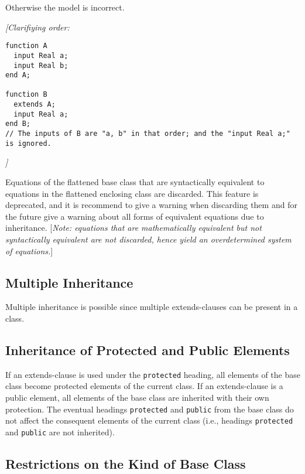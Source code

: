 Otherwise the model is incorrect.

\emph{{[}Clarifiying order:}
\begin{lstlisting}[language=modelica]
function A
  input Real a;
  input Real b;
end A;

function B
  extends A;
  input Real a;
end B;
// The inputs of B are "a, b" in that order; and the "input Real a;" is ignored.
\end{lstlisting}
\emph{{]}}

Equations of the flattened base class that are syntactically equivalent
to equations in the flattened enclosing class are discarded. This
feature is deprecated, and it is recommend to give a warning when
discarding them and for the future give a warning about all forms of
equivalent equations due to inheritance. {[}\emph{Note: equations that
are mathematically equivalent but not syntactically equivalent are not
discarded, hence yield an overdetermined system of equations.}{]}

\subsection{Multiple Inheritance}

Multiple inheritance is possible since multiple extends-clauses can be
present in a class.

\subsection{Inheritance of Protected and Public Elements}

If an extends-clause is used under the \lstinline[basicstyle=\ttfamily]!protected! heading, all elements
of the base class become protected elements of the current class. If an
extends-clause is a public element, all elements of the base class are
inherited with their own protection. The eventual headings \lstinline[basicstyle=\ttfamily]!protected! and
\lstinline[basicstyle=\ttfamily]!public! from the base class do not affect the consequent elements of the
current class (i.e., headings \lstinline[basicstyle=\ttfamily]!protected! and \lstinline[basicstyle=\ttfamily]!public! are not inherited).

\subsection{Restrictions on the Kind of Base Class}

